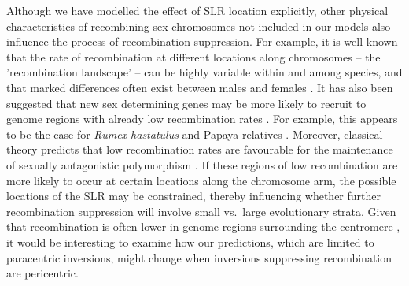 \documentclass{article}[12pt]
\begin{document}
Although we have modelled the effect of SLR location explicitly, other physical characteristics of recombining sex chromosomes not included in our models also influence the process of recombination suppression. For example, it is well known that the rate of recombination at different locations along chromosomes -- the 'recombination landscape' -- can be highly variable within and among species, and that marked differences often exist between males and females \citep[reviewed in ][]{SinghalEtAl2015, SardellKirkpatrick2020}. It has also been suggested that new sex determining genes may be more likely to recruit to genome regions with already low recombination rates \citep{Charlesworth1978a,vanDoornKirkpatrick2007, vanDoornKirkpatrick2010, OttoScottOsmond2018, Charlesworth2015, Olito2019}. For example, this appears to be the case for {\itshape Rumex hastatulus} and Papaya relatives \citep{RifkinBarrettWright2020,Lovene2015}. Moreover, classical theory predicts that low recombination rates are favourable for the maintenance of sexually antagonistic polymorphism \citep{Charlesworth1978a,Olito2017,Olito2019,Charlesworth2018}. If these regions of low recombination are more likely to occur at certain locations along the chromosome arm, the possible locations of the SLR may be constrained, thereby influencing whether further recombination suppression will involve small vs.~large evolutionary strata. Given that recombination is often lower in genome regions surrounding the centromere \citep[e.g.,][]{MahtaniWillard1998,SardellKirkpatrick2020}, it would be interesting to examine how our predictions, which are limited to paracentric inversions, might change when inversions suppressing recombination are pericentric.

\end{document}
